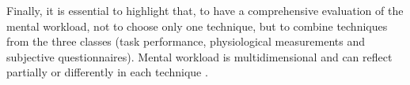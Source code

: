         Finally, it is essential to highlight that, to have a comprehensive evaluation of the mental workload, not to choose only one technique, but to combine techniques from the three classes (task performance, physiological measurements and subjective questionnaires). Mental workload is multidimensional and can reflect partially or differently in each technique \cite{sanders1998human}.